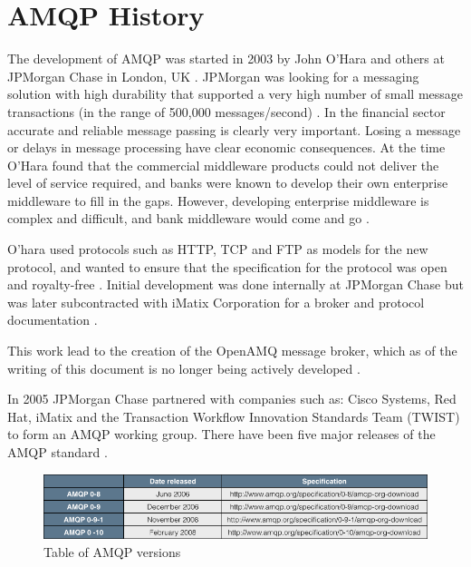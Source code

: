 \documentclass{thesis}
\begin{document}
\section{AMQP History}
The development of AMQP was started in 2003 by John O'Hara and others at JPMorgan Chase in London, UK \cite{O'Hara}.  JPMorgan was looking for a messaging solution with high durability that supported a very high number of small message transactions (in the range of 500,000 messages/second) \cite{Kramer}.  In the financial sector accurate and reliable message passing is clearly very important.  Losing a message or delays in message processing have clear economic consequences.  At the time O'Hara found that the commercial middleware products could not deliver the level of service required,  and banks were known to develop their own enterprise middleware to fill in the gaps. However, developing enterprise middleware is complex and difficult, and bank middleware would come and go \cite{Kramer}.

O'hara used protocols such as HTTP, TCP and FTP as models for the new protocol, and wanted to ensure that the specification for the protocol was open and royalty-free \cite{O'Hara}.  Initial development was done internally at JPMorgan Chase but was later subcontracted with iMatix Corporation for a broker and protocol documentation \cite{Apps, Cameron}.

This work lead to the creation of the OpenAMQ message broker, which as of the writing of this document is no longer being actively developed \cite{OPEN_AMQ}. 

In 2005 JPMorgan Chase partnered with companies such as: Cisco Systems, Red Hat, iMatix and the Transaction Workflow Innovation Standards Team (TWIST) to form an AMQP working group.  There have been five major releases of the AMQP standard \cite{AMQP_SPECS}.

\begin{figure}[h]
\centering
\includegraphics[scale=.5]{amqp_versions}  
\caption{Table of AMQP versions }
\end{figure}
\end{document}
